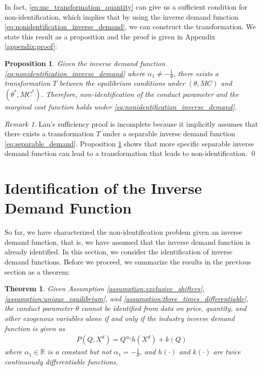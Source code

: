 \documentclass[11pt, a4paper]{article}
\newtheorem{theorem}{Theorem}
\newtheorem{proposition}{Proposition}
\theoremstyle{remark}
\newtheorem{remark}{Remark}
\begin{document}
In fact, \eqref{eq:mc_transformation_quantity} can give us a sufficient condition for non-identification, which implies that by using the inverse demand function \eqref{eq:nonidentification_inverse_demand}, we can construct the transformation.
We state this result as a proposition and the proof is given in Appendix \ref{appendix:proof}:
\begin{proposition}\label{proposition:sufficient_nonidentification}
    Given the inverse demand function \eqref{eq:nonidentification_inverse_demand} where $\alpha_1 \ne -\frac{1}{\theta}$, there exists a transformation $T$ between the equilibrium conditions under $(\theta, MC)$ and $(\theta^{*}, MC^{*})$.
    Therefore, non-identification of the conduct parameter and the marginal cost function holds under \eqref{eq:nonidentification_inverse_demand}.
\end{proposition}


\begin{remark}
    Lau's sufficiency proof is incomplete because it implicitly assumes that there exists a transformation $T$ under a separable inverse demand function \eqref{eq:separable_demand}.
    Proposition \ref{proposition:sufficient_nonidentification} shows that more specific separable inverse demand function can lead to a transformation that leads to non-identification. \qed
\end{remark}

\section{Identification of the Inverse Demand Function}\label{sec:identification_inverse_demand}

So far, we have characterized the non-identification problem given an inverse demand function, that is, we have assumed that the inverse demand function is already identified.
In this section, we consider the identification of inverse demand functions.
Before we proceed, we summarize the results in the previous section as a theorem:
\begin{theorem}\label{theorem:identification_characterization}
    Given Assumption \ref{assumption:exclusive_shifters}, \ref{assumption:unique_equilibrium}, and \ref{assumption:three_times_differentiable}, the conduct parameter $\theta$ cannot be identified from data on price, quantity, and other exogenous variables alone if and only if the industry inverse demand function is given as
    \begin{align}
        P(Q, X^{d}) = Q^{\alpha_1}h(X^{d}) + k(Q)
    \end{align}
    where $\alpha_1 \in \mathbb{R}$ is a constant but not $\alpha_1 = -\frac{1}{\theta}$, and $h(\cdot)$ and $k(\cdot)$ are twice continuously differentiable functions.
\end{theorem}
\end{document}
